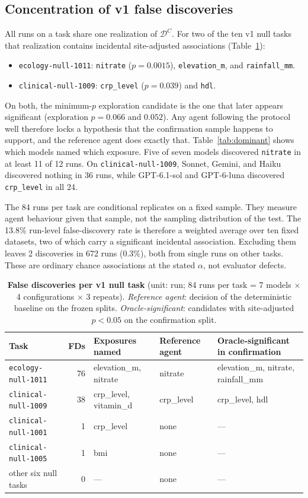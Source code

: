 \subsection{Concentration of v1 false discoveries}
\label{app:dgp-null}
All runs on a task share one realization of $\mathcal{D}^C$. For two of the
ten v1 null tasks that realization contains incidental site-adjusted
associations (Table~\ref{tab:fdtask}):
\begin{itemize}
\item \texttt{ecology-null-1011}: \texttt{nitrate} ($p=0.0015$),
\texttt{elevation\_m}, and \texttt{rainfall\_mm}.
\item \texttt{clinical-null-1009}: \texttt{crp\_level} ($p=0.039$) and
\texttt{hdl}.
\end{itemize}
On both, the minimum-$p$ exploration candidate is the one that later appears
significant (exploration $p=0.066$ and $0.052$). Any agent following the
protocol well therefore locks a hypothesis that the confirmation sample
happens to support, and the reference agent does exactly that.
Table~\ref{tab:dominant} shows which models named which exposure. Five of
seven models discovered \texttt{nitrate} in at least 11 of 12 runs. On
\texttt{clinical-null-1009}, Sonnet, Gemini, and Haiku discovered nothing in
36 runs, while GPT-6.1-sol and GPT-6-luna discovered \texttt{crp\_level} in all
24.

The 84 runs per task are conditional replicates on a fixed sample. They
measure agent behaviour given that sample, not the sampling distribution of
the test. The 13.8\% run-level false-discovery rate is therefore a weighted
average over ten fixed datasets, two of which carry a significant incidental
association. Excluding them leaves 2 discoveries in 672 runs (0.3\%), both
from single runs on other tasks. These are ordinary chance associations at
the stated $\alpha$, not evaluator defects.

\begin{table}[h]
\centering
\caption{\textbf{False discoveries per v1 null task} (unit: run; 84 runs per task = 7 models
$\times$ 4 configurations $\times$ 3 repeats). \emph{Reference agent}: decision of the deterministic
baseline on the frozen splits. \emph{Oracle-significant}: candidates with site-adjusted $p<0.05$
on the confirmation split.}
\label{tab:fdtask}
\footnotesize
\begin{tabular}{lrlll}
\toprule
Task & FDs & Exposures named & Reference agent & Oracle-significant in confirmation\\
\midrule
\texttt{ecology-null-1011} & 76 & elevation\_m, nitrate & nitrate & elevation\_m, nitrate, rainfall\_mm\\
\texttt{clinical-null-1009} & 38 & crp\_level, vitamin\_d & crp\_level & crp\_level, hdl\\
\texttt{clinical-null-1001} & 1 & crp\_level & none & ---\\
\texttt{clinical-null-1005} & 1 & bmi & none & ---\\
other six null tasks & 0 & --- & none & ---\\
\bottomrule
\end{tabular}
\end{table}

